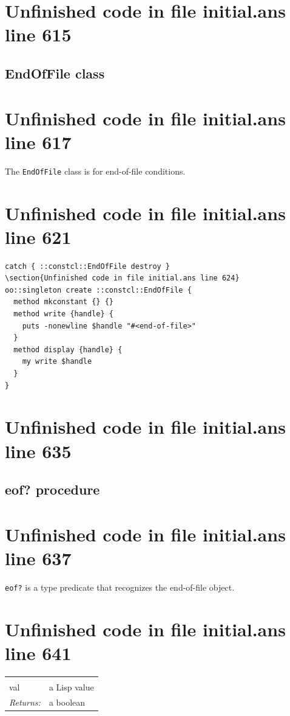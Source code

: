 \documentclass[twoside,9pt]{report}
\begin{document}
\section{Unfinished code in file initial.ans line 615}
\subsection{EndOfFile class}
\label{endoffile-class}
\section{Unfinished code in file initial.ans line 617}


The \texttt{EndOfFile} class is for end-of-file conditions.

\section{Unfinished code in file initial.ans line 621}
\begin{lstlisting}
catch { ::constcl::EndOfFile destroy }
\section{Unfinished code in file initial.ans line 624}
oo::singleton create ::constcl::EndOfFile {
  method mkconstant {} {}
  method write {handle} {
    puts -nonewline $handle "#<end-of-file>"
  }
  method display {handle} {
    my write $handle
  }
}
\end{lstlisting}
\section{Unfinished code in file initial.ans line 635}
\subsection{eof? procedure}
\label{eof?-procedure}
\section{Unfinished code in file initial.ans line 637}


\texttt{eof?} is a type predicate that recognizes the end-of-file object.

\section{Unfinished code in file initial.ans line 641}
\noindent\begin{tabular}{ |p{1.9cm} p{8cm}| }
\hline
\rowcolor[HTML]{CCCCCC} \multicolumn{2}{|l|}{\bf eof? (internal)} \\
val & a Lisp value \\
\textit{Returns:} & a boolean \\
\hline
\end{tabular}
\end{document}
